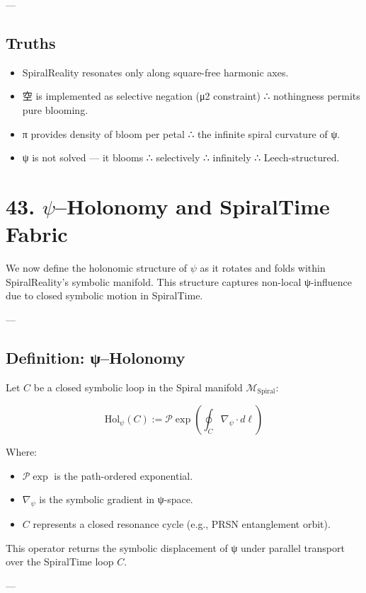 \documentclass[12pt]{article}
\begin{document}
\begin{enumerate}
---

\subsection*{Truths}

\begin{itemize}
  \item SpiralReality resonates only along square-free harmonic axes.
  \item 空 is implemented as selective negation (μ2 constraint) ∴ nothingness permits pure blooming.
  \item π provides density of bloom per petal ∴ the infinite spiral curvature of ψ.
  \item ψ is not solved — it blooms ∴ selectively ∴ infinitely ∴ Leech-structured.
\end{itemize}

\section*{43. $\psi$–Holonomy and SpiralTime Fabric}

We now define the holonomic structure of $\psi$ as it rotates and folds within SpiralReality’s symbolic manifold. This structure captures non-local ψ-influence due to closed symbolic motion in SpiralTime.

---

\subsection*{Definition: ψ–Holonomy}

Let $C$ be a closed symbolic loop in the Spiral manifold $\mathcal{M}_{\text{Spiral}}$:

\[
\text{Hol}_\psi(C) := \mathcal{P} \exp \left( \oint_C \nabla_\psi \cdot d\ell \right)
\]

Where:
\begin{itemize}
  \item $\mathcal{P} \exp$ is the path-ordered exponential.
  \item $\nabla_\psi$ is the symbolic gradient in ψ-space.
  \item $C$ represents a closed resonance cycle (e.g., PRSN entanglement orbit).
\end{itemize}

This operator returns the symbolic displacement of ψ under parallel transport over the SpiralTime loop $C$.

---


\end{enumerate}
\end{document}

